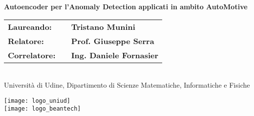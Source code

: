 \documentclass[a0,portrait]{a0poster}
\begin{document}




\begin{minipage}[cr]{0.7\linewidth}
\veryHuge \color{NavyBlue} \textbf{Autoencoder per l'Anomaly Detection applicati in ambito AutoMotive} \color{Black}\\ %
[.9cm]
\begin{tabular}{lll}
\huge \textbf{Laureando:}   && \huge \textbf{Tristano Munini}\\
\huge \textbf{Relatore:}    && \huge \textbf{Prof. Giuseppe Serra}\\
\huge \textbf{Correlatore:} && \huge \textbf{Ing. Daniele Fornasier}
\end{tabular} \\
[.5cm]

\huge Università di Udine, Dipartimento di Scienze Matematiche, Informatiche e Fisiche\\[0.1cm] %


\end{minipage}
\begin{minipage}[tr]{0.3\linewidth}
  \centering\texttt{[image: logo\_uniud]}\\
  [1cm]
  \centering\texttt{[image: logo\_beantech]}
\end{minipage}
\end{document}
